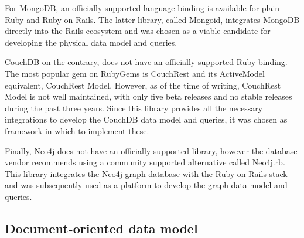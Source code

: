 For MongoDB, an officially supported language binding is available for plain Ruby and Ruby on Rails.
The latter library, called Mongoid, integrates MongoDB directly into the Rails ecosystem and was chosen as a viable candidate for developing the physical data model and queries.

CouchDB on the contrary, does not have an officially supported Ruby binding.
The most popular gem on RubyGems is CouchRest and its ActiveModel equivalent, CouchRest Model.
However, as of the time of writing, CouchRest Model is not well maintained, with only five beta releases and no stable releases during the past three years.
Since this library provides all the necessary integrations to develop the CouchDB data model and queries, it was chosen as framework in which to implement these.

Finally, Neo4j does not have an officially supported library, however the database vendor recommends using a community supported alternative called Neo4j.rb.
This library integrates the Neo4j graph database with the Ruby on Rails stack and was subsequently used as a platform to develop the graph data model and queries.


\subsection{Document-oriented data model}
\label{subsec:document-data-model}






